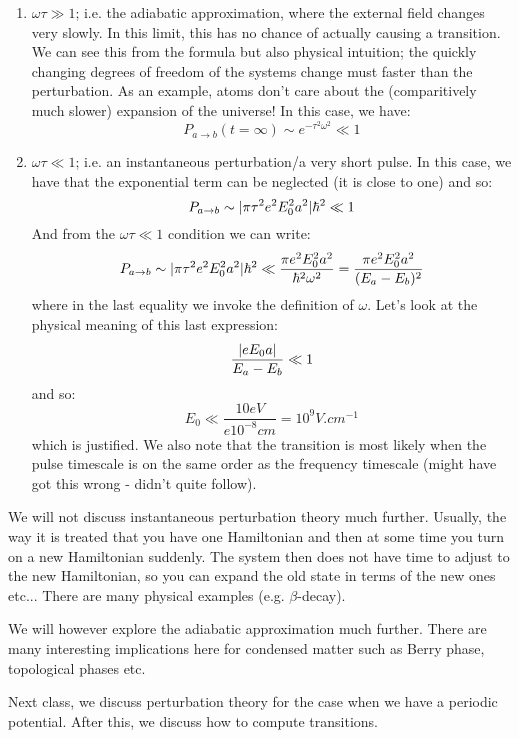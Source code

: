 \begin{enumerate}
    \item $\omega \tau \gg 1$; i.e. the adiabatic approximation, where the external field changes very slowly. In this limit, this has no chance of actually causing a transition. We can see this from the formula but also physical intuition; the quickly changing degrees of freedom of the systems change must faster than the perturbation. As an example, atoms don't care about the (comparitively much slower) expansion of the universe! In this case, we have:
    \begin{equation}
        P_{a \to b}(t = \infty) \sim e^{-\tau^2\omega^2} \ll 1
    \end{equation}
    \item $\omega \tau \ll 1$; i.e. an instantaneous perturbation/a very short pulse. In this case, we have that the exponential term can be neglected (it is close to one) and so:
    \begin{equation}
        P_{a \to b} \sim \lvert \pi \tau^2 e^2 E_0^2 a^2 \rvert{\hbar^2} \ll 1
    \end{equation}
    And from the $\omega \tau \ll 1$ condition we can write:
    \begin{equation}
        P_{a \to b} \sim \lvert \pi \tau^2 e^2 E_0^2 a^2 \rvert{\hbar^2} \ll \frac{\pi e^2E_0^2 a^2}{\hbar^2\omega^2} = \frac{\pi e^2E_0^2 a^2}{(E_a - E_b)^2}
    \end{equation}
    where in the last equality we invoke the definition of $\omega$. Let's look at the physical meaning of this last expression:
    \begin{equation}
        \frac{\lvert eE_0a \rvert}{E_a - E_b} \ll 1
    \end{equation}
    and so:
    \begin{equation}
        E_0 \ll \frac{10\si{eV}}{e 10^{-8}\si{cm}} = 10^9 \si{V.cm^{-1}}
    \end{equation}
    which is justified. We also note that the transition is most likely when the pulse timescale is on the same order as the frequency timescale (might have got this wrong - didn't quite follow).
\end{enumerate}

We will not discuss instantaneous perturbation theory much further. Usually, the way it is treated that you have one Hamiltonian and then at some time you turn on a new Hamiltonian suddenly. The system then does not have time to adjust to the new Hamiltonian, so you can expand the old state in terms of the new ones etc... There are many physical examples (e.g. $\beta$-decay). 

We will however explore the adiabatic approximation much further. There are many interesting implications here for condensed matter such as Berry phase, topological phases etc.

Next class, we discuss perturbation theory for the case when we have a periodic potential. After this, we discuss how to compute transitions.